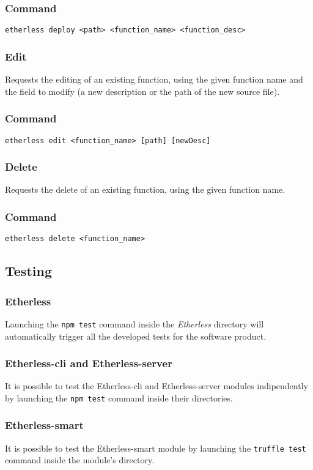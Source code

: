 	\subsubsection*{Command}
	\texttt{etherless deploy <path> <function\_name> <function\_desc>}
	\subsubsection{Edit}
	Requests the editing of an existing function, using the given function name and the field to modify (a new description or the path of the new source file).
	\subsubsection*{Command}
	\texttt{etherless edit <function\_name> [path] [newDesc]}
	\subsubsection{Delete}
	Requests the delete of an existing function, using the given function name.
	\subsubsection*{Command}
	\texttt{etherless delete <function\_name>}
\subsection{Testing}
\subsubsection{Etherless}
Launching the \texttt{npm test} command inside the \textit{Etherless} directory will automatically trigger all the developed tests for the software product.
\subsubsection{Etherless-cli and Etherless-server}
It is possible to test the Etherless-cli and Etherless-server modules indipendently by launching the \texttt{npm test} command inside their directories.
\subsubsection{Etherless-smart}
It is possible to test the Etherless-smart module by launching the \texttt{truffle test} command inside the module's directory.
